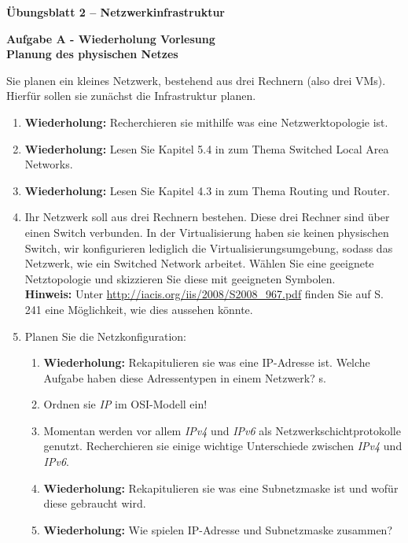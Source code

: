 \documentclass[paper=a4,fontsize=11pt]{scrartcl}%
\numberwithin{equation}{section}
\begin{document}
\begin{center}
\Large{\textbf{Übungsblatt 2 -- Netzwerkinfrastruktur}}
\end{center}

\begin{center}\Large{\textbf{Aufgabe A - Wiederholung Vorlesung\\Planung des physischen Netzes}}\end{center}

Sie planen ein kleines Netzwerk, bestehend aus drei Rechnern (also drei VMs). Hierfür sollen sie zunächst die Infrastruktur planen.
\begin{enumerate}
	\item \textbf{Wiederholung:} Recherchieren sie mithilfe \cite[S. 461ff]{Kurose2012}  was eine Netzwerktopologie ist.
	\item  \textbf{Wiederholung:} Lesen Sie Kapitel 5.4 in \cite[S. 461]{Kurose2012} zum Thema Switched Local Area Networks.
	\item \textbf{Wiederholung:} Lesen Sie Kapitel 4.3 in \cite[S. 320ff]{Kurose2012} zum Thema Routing und Router.
	\item Ihr Netzwerk soll aus drei Rechnern bestehen. Diese drei Rechner sind über einen Switch verbunden. In der Virtualisierung haben sie keinen physischen Switch, wir konfigurieren lediglich die Virtualisierungsumgebung, sodass das Netzwerk, wie ein Switched Network arbeitet.
	Wählen Sie eine geeignete Netztopologie und skizzieren Sie diese mit geeigneten Symbolen.\\ 
	\textbf{Hinweis:} Unter \url{http://iacis.org/iis/2008/S2008_967.pdf} finden Sie auf S. 241 eine Möglichkeit, wie dies aussehen könnte.\\
	\item Planen Sie die Netzkonfiguration:
	\begin{enumerate}
		\item  \textbf{Wiederholung:} Rekapitulieren sie was eine IP-Adresse ist. Welche Aufgabe haben diese Adressentypen in einem Netzwerk? s. \cite[S. 331ff]{Kurose2012}
		\item Ordnen sie \emph{IP} im OSI-Modell ein!
		\item Momentan werden vor allem \emph{IPv4} und \emph{IPv6} als Netzwerkschichtprotokolle genutzt. Recherchieren sie einige wichtige Unterschiede zwischen \emph{IPv4} und \emph{IPv6}.
		\item  \textbf{Wiederholung:} Rekapitulieren sie was eine Subnetzmaske ist und wofür diese gebraucht wird.
		\item \textbf{Wiederholung:} Wie spielen IP-Adresse und Subnetzmaske zusammen?

\end{enumerate}
\end{enumerate}
\end{document}
